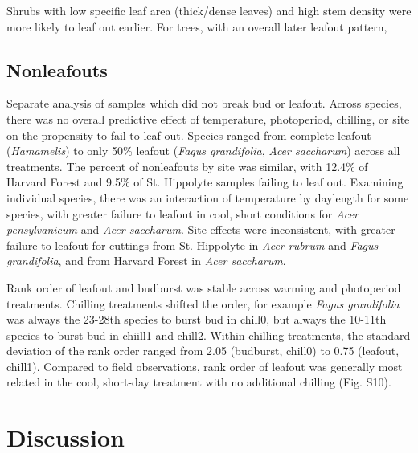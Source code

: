 \documentclass{article}
\begin{document}
Shrubs with low specific leaf area (thick/dense leaves) and high stem density were more likely to leaf out earlier. For trees, with an overall later leafout pattern, 

\subsection*{Nonleafouts}

Separate analysis of samples which did not break bud or leafout. Across species, there was no overall predictive effect of temperature, photoperiod, chilling, or site on the propensity to fail to leaf out. 
Species ranged from complete leafout (\emph{Hamamelis}) to only 50\% leafout (\emph{Fagus grandifolia}, \emph{Acer saccharum}) across all treatments. The percent of nonleafouts by site was similar, with 12.4\% of Harvard Forest and 9.5\% of St. Hippolyte samples failing to leaf out. Examining individual species,  there was an interaction of temperature by daylength for some species, with greater failure to leafout in cool, short conditions for \emph{Acer pensylvanicum}  and \emph{Acer saccharum}. Site effects were inconsistent, with greater failure to leafout for cuttings from St. Hippolyte in \emph{Acer rubrum} and \emph{Fagus grandifolia}, and from Harvard Forest in \emph{Acer saccharum}.


Rank order of leafout and budburst was stable across warming and photoperiod treatments. Chilling treatments shifted the order, for example \emph{Fagus grandifolia} was always the 23-28th species to burst bud in chill0, but always the 10-11th species to burst bud in chiill1 and chill2. Within chilling treatments, the standard deviation of the rank order ranged from 2.05 (budburst, chill0) to 0.75 (leafout, chill1). Compared to field observations, rank order of leafout was generally most related in the cool, short-day treatment with no additional chilling (Fig. S10).



\section*{Discussion}
\end{document}
